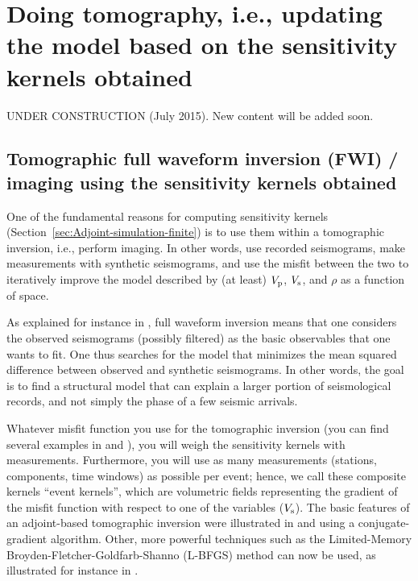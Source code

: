 \chapter[Doing tomography based on the sensitivity kernels obtained]{Doing tomography, i.e., updating the model based on the sensitivity kernels obtained}\label{cha:tomo}

UNDER CONSTRUCTION (July 2015). New content will be added soon.

\section{Tomographic full waveform inversion (FWI) / imaging using the sensitivity kernels obtained}

One of the fundamental reasons for computing sensitivity kernels (Section~\ref{sec:Adjoint-simulation-finite})
is to use them within a tomographic inversion, i.e., perform imaging. In other words, use
recorded seismograms, make measurements with synthetic seismograms,
and use the misfit between the two to iteratively improve the model
described by (at least) $V_{{\rm p}}$, $V_{{\rm s}}$, and $\rho$ as a function of space.

As explained for instance in \cite{MoChKoWa15},
full waveform inversion means that one considers the observed seismograms (possibly filtered) as the
basic observables that one wants to fit. One thus searches for the model that minimizes the mean squared difference between observed
and synthetic seismograms. In other words, the goal is to find a structural model that can explain a larger portion
of seismological records, and not simply the phase of a few seismic arrivals.

Whatever misfit function you use for the tomographic inversion (you can find several
examples in \citet{TrKoLi08} and \citet{TrTaLi05}), you will weigh
the sensitivity kernels with measurements. Furthermore, you will use
as many measurements (stations, components, time windows) as possible
per event; hence, we call these composite kernels ``event kernels'',
which are volumetric fields representing the gradient of the misfit
function with respect to one of the variables (\eg $V_{{\rm s}}$).
The basic features of an adjoint-based tomographic inversion were
illustrated in \citet{TrKoLi08} and \citet{TaLiTr07} using a conjugate-gradient algorithm.
Other, more powerful techniques such as the Limited-Memory Broyden-Fletcher-Goldfarb-Shanno (L-BFGS) method can now be used,
as illustrated for instance in \cite{MoChKoWa15}.

